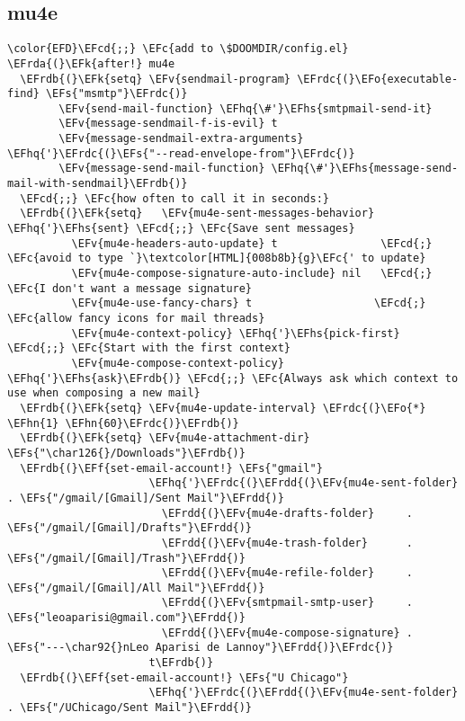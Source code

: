 \documentclass[c]{article}
\theoremstyle{plain}%
\theoremstyle{definition}
\theoremstyle{remark}
\newcommand{\EFc}[1]{\textcolor{EFc}{#1}} %
\newcommand{\EFcd}[1]{\textcolor{EFcd}{#1}} %
\newcommand{\EFs}[1]{\textcolor{EFs}{#1}} %
\newcommand{\EFk}[1]{\textcolor{EFk}{#1}} %
\newcommand{\EFf}[1]{\textcolor{EFf}{#1}} %
\newcommand{\EFv}[1]{\textcolor{EFv}{#1}} %
\newcommand{\EFo}[1]{\textcolor{EFo}{#1}} %
\newcommand{\EFhn}[1]{\textcolor{EFhn}{\textbf{#1}}} %
\newcommand{\EFhq}[1]{\textcolor{EFhq}{#1}} %
\newcommand{\EFhs}[1]{\textcolor{EFhs}{#1}} %
\newcommand{\EFrda}[1]{\textcolor{EFrda}{#1}} %
\newcommand{\EFrdb}[1]{\textcolor{EFrdb}{#1}} %
\newcommand{\EFrdc}[1]{\textcolor{EFrdc}{#1}} %
\newcommand{\EFrdd}[1]{\textcolor{EFrdd}{#1}} %
\begin{document}
\subsection{mu4e}
\label{sec:orgea76b12}
\begin{Code}
\begin{Verbatim}
\color{EFD}\EFcd{;;} \EFc{add to \$DOOMDIR/config.el}
\EFrda{(}\EFk{after!} mu4e
  \EFrdb{(}\EFk{setq} \EFv{sendmail-program} \EFrdc{(}\EFo{executable-find} \EFs{"msmtp"}\EFrdc{)}
        \EFv{send-mail-function} \EFhq{\#'}\EFhs{smtpmail-send-it}
        \EFv{message-sendmail-f-is-evil} t
        \EFv{message-sendmail-extra-arguments} \EFhq{'}\EFrdc{(}\EFs{"--read-envelope-from"}\EFrdc{)}
        \EFv{message-send-mail-function} \EFhq{\#'}\EFhs{message-send-mail-with-sendmail}\EFrdb{)}
  \EFcd{;;} \EFc{how often to call it in seconds:}
  \EFrdb{(}\EFk{setq}   \EFv{mu4e-sent-messages-behavior} \EFhq{'}\EFhs{sent} \EFcd{;;} \EFc{Save sent messages}
          \EFv{mu4e-headers-auto-update} t                \EFcd{;} \EFc{avoid to type `}\textcolor[HTML]{008b8b}{g}\EFc{' to update}
          \EFv{mu4e-compose-signature-auto-include} nil   \EFcd{;} \EFc{I don't want a message signature}
          \EFv{mu4e-use-fancy-chars} t                   \EFcd{;} \EFc{allow fancy icons for mail threads}
          \EFv{mu4e-context-policy} \EFhq{'}\EFhs{pick-first}   \EFcd{;;} \EFc{Start with the first context}
          \EFv{mu4e-compose-context-policy} \EFhq{'}\EFhs{ask}\EFrdb{)} \EFcd{;;} \EFc{Always ask which context to use when composing a new mail}
  \EFrdb{(}\EFk{setq} \EFv{mu4e-update-interval} \EFrdc{(}\EFo{*} \EFhn{1} \EFhn{60}\EFrdc{)}\EFrdb{)}
  \EFrdb{(}\EFk{setq} \EFv{mu4e-attachment-dir} \EFs{"\char126{}/Downloads"}\EFrdb{)}
  \EFrdb{(}\EFf{set-email-account!} \EFs{"gmail"}
                      \EFhq{'}\EFrdc{(}\EFrdd{(}\EFv{mu4e-sent-folder}       . \EFs{"/gmail/[Gmail]/Sent Mail"}\EFrdd{)}
                        \EFrdd{(}\EFv{mu4e-drafts-folder}     . \EFs{"/gmail/[Gmail]/Drafts"}\EFrdd{)}
                        \EFrdd{(}\EFv{mu4e-trash-folder}      . \EFs{"/gmail/[Gmail]/Trash"}\EFrdd{)}
                        \EFrdd{(}\EFv{mu4e-refile-folder}     . \EFs{"/gmail/[Gmail]/All Mail"}\EFrdd{)}
                        \EFrdd{(}\EFv{smtpmail-smtp-user}     . \EFs{"leoaparisi@gmail.com"}\EFrdd{)}
                        \EFrdd{(}\EFv{mu4e-compose-signature} . \EFs{"---\char92{}nLeo Aparisi de Lannoy"}\EFrdd{)}\EFrdc{)}
                      t\EFrdb{)}
  \EFrdb{(}\EFf{set-email-account!} \EFs{"U Chicago"}
                      \EFhq{'}\EFrdc{(}\EFrdd{(}\EFv{mu4e-sent-folder}       . \EFs{"/UChicago/Sent Mail"}\EFrdd{)}

\end{Verbatim}
\end{Code}
\end{document}
